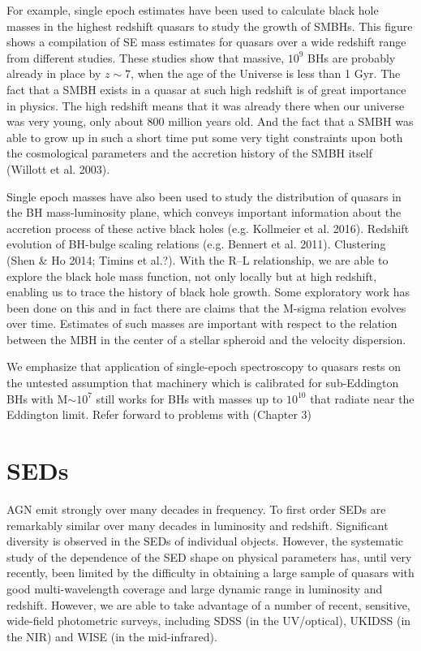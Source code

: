 For example, single epoch estimates have been used to calculate black hole masses in the highest redshift quasars to study the growth of SMBHs. 
This figure shows a compilation of SE mass estimates for quasars over a wide redshift range from different studies. 
These studies show that massive, $10^9$ BHs are probably already in place by $z\sim7$, when the age of the Universe is less than 1 Gyr.
The fact that a SMBH exists in a quasar at such high redshift is of great importance in physics.
The high redshift means that it was already there when our universe was very young, only about
800 million years old. And the fact that a SMBH was able to grow up in such a short time put
some very tight constraints upon both the cosmological parameters and the accretion history of the
SMBH itself (Willott et al. 2003).

Single epoch masses have also been used to study the distribution of quasars in the BH mass-luminosity plane, which conveys important information about the accretion process of these active black holes (e.g. Kollmeier et al. 2016). 
Redshift evolution of BH-bulge scaling relations (e.g. Bennert et al. 2011). 
Clustering (Shen \& Ho 2014; Timins et al.?). 
With the R–L relationship, we are able to explore the black hole mass function, not only locally but at high redshift, enabling us to trace the history of black hole growth.
Some exploratory work has been done on this and in fact there are claims that the M-sigma relation evolves over time. 
Estimates of such masses are important with respect to the relation between the MBH in the center of a stellar spheroid and the velocity dispersion. 

We emphasize that application of single-epoch spectroscopy to quasars rests on the untested assumption that machinery which is calibrated for sub-Eddington BHs with M$\sim10^7$ still works for BHs with masses up to $10^{10}$ that radiate near the Eddington limit. 
Refer forward to problems with  (Chapter 3)

\section{SEDs}

\ac{AGN} emit strongly over many decades in frequency. 
To first order SEDs are remarkably similar over many decades in luminosity and redshift. 
Significant diversity is observed in the \ac{SED}s of individual objects. 
However, the systematic study of the dependence of the \ac{SED} shape on physical parameters has, until very recently, been limited by the difficulty in obtaining a large sample of quasars with good multi-wavelength coverage and large dynamic range in luminosity and redshift. 
However, we are able to take advantage of a number of recent, sensitive, wide-field photometric surveys, including SDSS (in the UV/optical), UKIDSS (in the \ac{NIR}) and WISE (in the mid-infrared).

